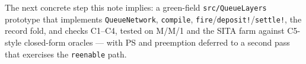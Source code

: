 \documentclass[11pt]{article}
\newcommand{\code}[1]{\texttt{#1}}
\begin{document}
The next concrete step this note implies: a green-field \code{src/QueueLayers}
prototype that implements \code{QueueNetwork}, \code{compile},
\code{fire}/\code{deposit!}/\code{settle!}, the record fold, and checks
C1--C4, tested on M/M/1 and the SITA farm against C5-style closed-form
oracles --- with PS and preemption deferred to a second pass that exercises the
\code{reenable} path.
\end{document}
